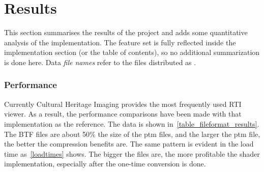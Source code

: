 \section{Results}
This section summarises the results of the project and adds some quantitative
analysis of the implementation. The feature set is fully reflected inside the
implementation section (or the table of contents), so no additional
summarization is done here. Data \emph{file names} refer to the files distributed as \cite*{goslar_oxrti_data:_2018}.

\subsubsection{Performance}
Currently Cultural Heritage Imaging provides the most frequently used RTI viewer\cite*{noauthor_cultural_nodate-1}. As a result, the performance comparisons have been made with that implementation as the reference. The data is shown
in~\autoref{table_fileformat_results}. The BTF files are about 50\% the size of
the ptm files, and the larger the ptm file, the better the compression benefits are.
The same pattern is evident in the load time as~\autoref{loadtimes} shows. The
bigger the files are, the more profitable the shader implementation, especially
after the one-time conversion is done.

